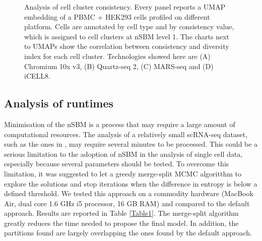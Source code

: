 \documentclass[10pt,letterpaper]{article}
\begin{document}
\begin{figure}[!h]
\centering
\caption[]{Analysis of cell cluster consistency. Every panel reports a UMAP embedding of a PBMC + HEK293 cells profiled on different platform. Cells are annotated by cell type and by consistency value, which is assigned to cell clusters at nSBM level 1. The charts next to UMAPs show the correlation between consistency and diversity index for each cell cluster. Technologies showed here are (A) Chromium 10x v3, (B) Quartz-seq 2, (C) MARS-seq and (D) iCELL8.}\label{Figure3}
\end{figure}





\subsection*{Analysis of runtimes}
Minimisation of the nSBM is a process that may require a large amount of computational resources. The analysis of a relatively small scRNA-seq dataset, such as the ones in \cite{mereu_2020}, may require several minutes to be processed. This could be a serious limitation to the adoption of nSBM in the analysis of single cell data, especially because several parameters should be tested. To overcome this limitation, it was suggested to let a greedy merge-split MCMC algoritthm \cite{peixoto_2020} to explore the solutions and stop iterations when the difference in entropy is below a defined threshold. We tested this approach on a commodity hardware (MacBook Air, dual core 1.6 GHz i5 processor, 16 GB RAM) and compared to the default approach. Results are reported in Table \ref{Table1}. The merge-split algorithm greatly reduces the time needed to propose the final model. In addition, the partitions found are largely overlapping the ones found by the default approach. 
\end{document}

